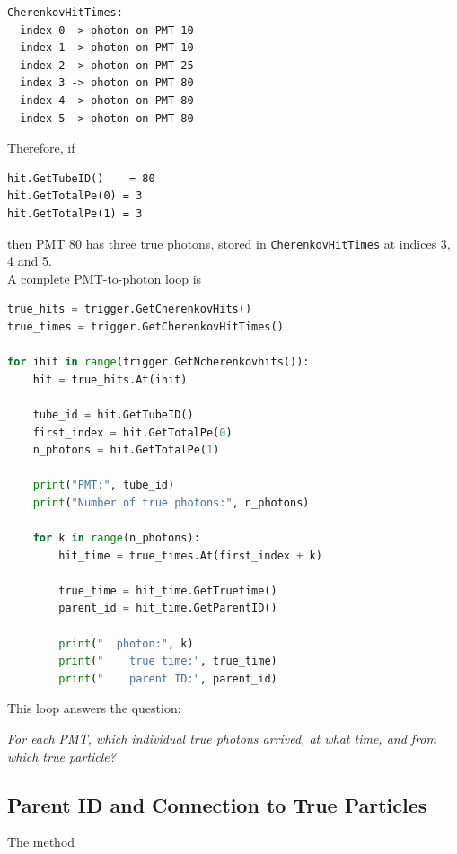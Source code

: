 \documentclass{article}
\numberwithin{table}{subsection}
\numberwithin{figure}{subsection}
\numberwithin{equation}{subsection}
\numberwithin{footnote}{subsection}
\begin{document}
\begin{lstlisting}
CherenkovHitTimes:
  index 0 -> photon on PMT 10
  index 1 -> photon on PMT 10
  index 2 -> photon on PMT 25
  index 3 -> photon on PMT 80
  index 4 -> photon on PMT 80
  index 5 -> photon on PMT 80
\end{lstlisting}
Therefore, if
\begin{lstlisting}
hit.GetTubeID()    = 80
hit.GetTotalPe(0) = 3
hit.GetTotalPe(1) = 3
\end{lstlisting}
then PMT 80 has three true photons, stored in \texttt{CherenkovHitTimes} at
indices 3, 4 and 5.\\
\newline
A complete PMT-to-photon loop is

\begin{lstlisting}[language=python]
true_hits = trigger.GetCherenkovHits()
true_times = trigger.GetCherenkovHitTimes()

for ihit in range(trigger.GetNcherenkovhits()):
    hit = true_hits.At(ihit)

    tube_id = hit.GetTubeID()
    first_index = hit.GetTotalPe(0)
    n_photons = hit.GetTotalPe(1)

    print("PMT:", tube_id)
    print("Number of true photons:", n_photons)

    for k in range(n_photons):
        hit_time = true_times.At(first_index + k)

        true_time = hit_time.GetTruetime()
        parent_id = hit_time.GetParentID()

        print("  photon:", k)
        print("    true time:", true_time)
        print("    parent ID:", parent_id)
\end{lstlisting}
This loop answers the question:

\begin{center}
\emph{For each PMT, which individual true photons arrived, at what time, and
from which true particle?}
\end{center}

\subsection{Parent ID and Connection to True Particles}

The method
\end{document}
